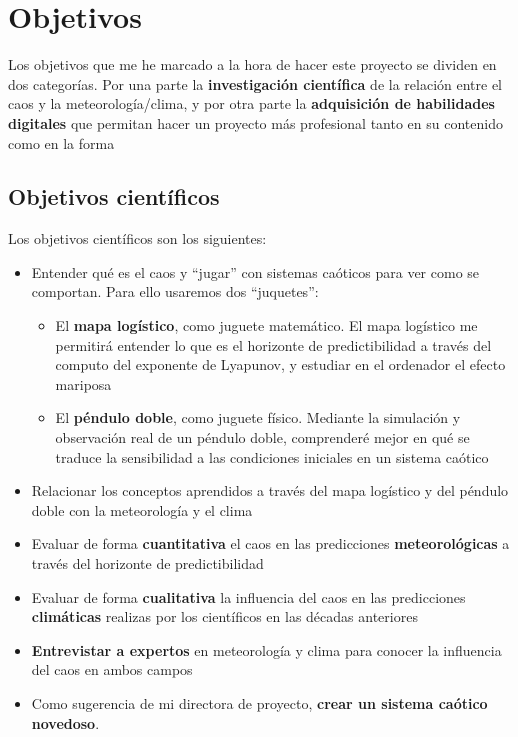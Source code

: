 \documentclass[
  11pt,
  a4paper,
  DIV=11,
  numbers=noendperiod]{scrreprt}
\providecommand{\tightlist}{%
  \setlength{\itemsep}{0pt}\setlength{\parskip}{0pt}}
\begin{document}
\chapter{Objetivos}\label{objetivos}

Los objetivos que me he marcado a la hora de hacer este proyecto se
dividen en dos categorías. Por una parte la \textbf{investigación
científica} de la relación entre el caos y la meteorología/clima, y por
otra parte la \textbf{adquisición de habilidades digitales} que permitan
hacer un proyecto más profesional tanto en su contenido como en la forma

\section{Objetivos científicos}\label{objetivos-cientuxedficos}

Los objetivos científicos son los siguientes:

\begin{itemize}
\item
  Entender qué es el caos y ``jugar'' con sistemas caóticos para ver
  como se comportan. Para ello usaremos dos ``juquetes'':

  \begin{itemize}
  \tightlist
  \item
    El \textbf{mapa logístico}, como juguete matemático. El mapa
    logístico me permitirá entender lo que es el horizonte de
    predictibilidad a través del computo del exponente de Lyapunov, y
    estudiar en el ordenador el efecto mariposa
  \item
    El \textbf{péndulo doble}, como juguete físico. Mediante la
    simulación y observación real de un péndulo doble, comprenderé mejor
    en qué se traduce la sensibilidad a las condiciones iniciales en un
    sistema caótico
  \end{itemize}
\item
  Relacionar los conceptos aprendidos a través del mapa logístico y del
  péndulo doble con la meteorología y el clima
\item
  Evaluar de forma \textbf{cuantitativa} el caos en las predicciones
  \textbf{meteorológicas} a través del horizonte de predictibilidad
\item
  Evaluar de forma \textbf{cualitativa} la influencia del caos en las
  predicciones \textbf{climáticas} realizas por los científicos en las
  décadas anteriores
\item
  \textbf{Entrevistar a expertos} en meteorología y clima para conocer
  la influencia del caos en ambos campos
\item
  Como sugerencia de mi directora de proyecto, \textbf{crear un sistema
  caótico novedoso}.
\end{itemize}
\end{document}
